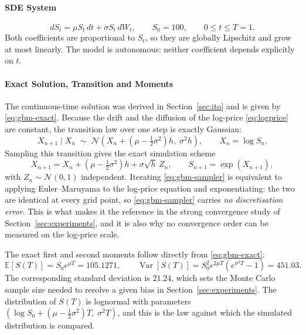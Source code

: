 \documentclass[11pt,a4paper]{article}
\theoremstyle{definition}
\theoremstyle{remark}
\begin{document}
\paragraph{SDE System}
\begin{equation}
    dS_t = \mu S_t\, dt + \sigma S_t\, dW_t,
    \qquad S_0 = 100,
    \qquad 0 \le t \le T = 1 .
    \label{eq:gbm-model}
\end{equation}
Both coefficients are proportional to $S_t$, so they are globally Lipschitz and
grow at most linearly. The model is autonomous: neither coefficient depends
explicitly on $t$.

\paragraph{Exact Solution, Transition and Moments}
The continuous-time solution was derived in Section~\ref{sec:ito} and is given
by \eqref{eq:gbm-exact}. Because the drift and the diffusion of the log-price
\eqref{eq:logprice} are constant, the transition law over one step is exactly
Gaussian:
\begin{equation}
    X_{n+1} \mid X_n \;\sim\;
    \mathcal{N}\!\left( X_n + \left( \mu - \tfrac12 \sigma^2 \right) h,\;
                    \sigma^2 h \right),
    \qquad X_n = \log S_n .
    \label{eq:gbm-transition}
\end{equation}
Sampling this transition gives the exact simulation scheme
\begin{equation}
    X_{n+1} = X_n + \left( \mu - \tfrac12 \sigma^2 \right) h
              + \sigma \sqrt{h}\, Z_n,
    \qquad
    S_{n+1} = \exp\left( X_{n+1} \right),
    \label{eq:gbm-sampler}
\end{equation}
with $Z_n \sim \mathcal{N}(0,1)$ independent. Iterating \eqref{eq:gbm-sampler}
is equivalent to applying Euler--Maruyama to the log-price equation and
exponentiating: the two are identical at every grid point, so
\eqref{eq:gbm-sampler} carries \emph{no discretisation error}. This is what
makes it the reference in the strong convergence study of
Section~\ref{sec:experiments}, and it is also why no convergence order can be
measured on the log-price scale.

The exact first and second moments follow directly from
\eqref{eq:gbm-exact}:
\begin{equation}
    \mathbb{E}[S(T)] = S_0 e^{\mu T} = 105.1271,
    \qquad
    \operatorname{Var}[S(T)] = S_0^2 e^{2\mu T}
        \left( e^{\sigma^2 T} - 1 \right) = 451.03 .
    \label{eq:gbm-moments}
\end{equation}
The corresponding standard deviation is $21.24$, which sets the Monte Carlo
sample size needed to resolve a given bias in Section~\ref{sec:experiments}.
The distribution of $S(T)$ is lognormal with parameters
$\left( \log S_0 + \left( \mu - \tfrac12\sigma^2 \right) T,\; \sigma^2 T
\right)$, and this is the law against which the simulated distribution is
compared.
\end{document}
